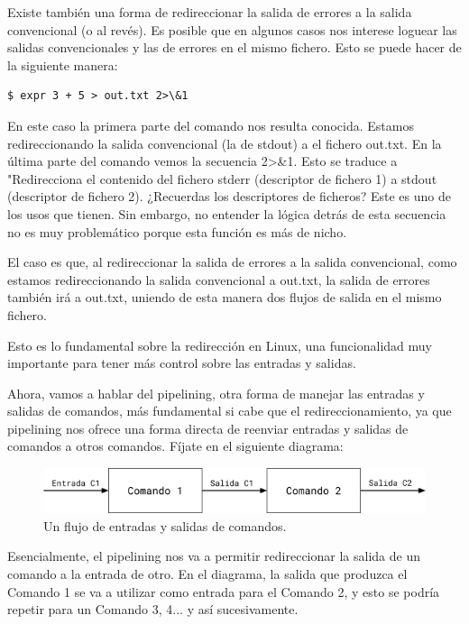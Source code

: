 Existe también una forma de redireccionar la salida de errores a la salida convencional (o al revés). Es posible que en algunos casos nos interese loguear las salidas convencionales y las de errores en el mismo fichero. Esto se puede hacer de la siguiente manera:

\begin{tcolorbox-code}
\begin{lstlisting}
$ expr 3 + 5 > out.txt 2>\&1
\end{lstlisting}
\end{tcolorbox-code}

En este caso la primera parte del comando nos resulta conocida. Estamos redireccionando la salida convencional (la de stdout) a el fichero out.txt. En la última parte del comando vemos la secuencia 2>\&1. Esto se traduce a "Redirecciona el contenido del fichero stderr (descriptor de fichero 1) a stdout (descriptor de fichero 2). ¿Recuerdas los descriptores de ficheros? Este es uno de los usos que tienen. Sin embargo, no entender la lógica detrás de esta secuencia no es muy problemático porque esta función es más de nicho. 

El caso es que, al redireccionar la salida de errores a la salida convencional, como estamos redireccionando la salida convencional a out.txt, la salida de errores también irá a out.txt, uniendo de esta manera dos flujos de salida en el mismo fichero.

Esto es lo fundamental sobre la redirección en Linux, una funcionalidad muy importante para tener más control sobre las entradas y salidas. 

Ahora, vamos a hablar del pipelining, otra forma de manejar las entradas y salidas de comandos, más fundamental si cabe que el redireccionamiento, ya que pipelining nos ofrece una forma directa de reenviar entradas y salidas de comandos a otros comandos. Fíjate en el siguiente diagrama:

\begin{figure}[H]
    \centering
    \includegraphics[width=0.8\linewidth]{resources/images/flujo_e_s.png}
    \caption{Un flujo de entradas y salidas de comandos.}
\end{figure}

Esencialmente, el pipelining nos va a permitir redireccionar la salida de un comando a la entrada de otro. En el diagrama, la salida que produzca el Comando 1 se va a utilizar como entrada para el Comando 2, y esto se podría repetir para un Comando 3, 4... y así sucesivamente.

